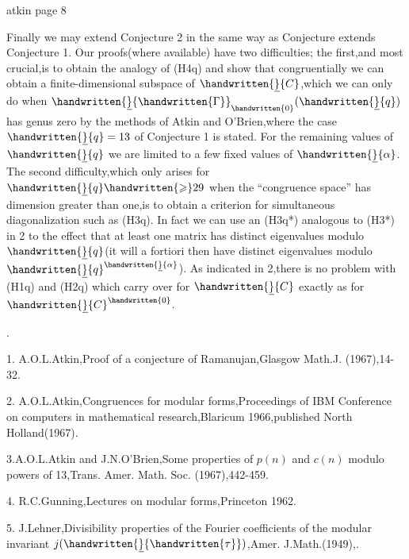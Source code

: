 \begin{flushright}atkin page 8\end{flushright}

Finally we may extend Conjecture 2 in the same way as Conjecture  extends Conjecture 1. Our proofs(where available) have two difficulties; the first,and most crucial,is to obtain the analogy of (H4q) and show that congruentially we can obtain a finite-dimensional subspace of $\handwritten{\underline}{C}$,which we can only do when $\handwritten{\underline}{\handwritten{\Gamma}}_{\handwritten{0}}(\handwritten{\underline}{q})$ has genus zero by the methods of Atkin and O'Brien,where the case $\handwritten{\underline}{q}=13$ of Conjecture 1 is stated. For the remaining values of $\handwritten{\underline}{q}$ we are limited to a few fixed values of $\handwritten{\underline}{\alpha}$. The second difficulty,which only arises for $\handwritten{\underline}{q}\handwritten{\geqslant}29$ when the ``congruence space'' has dimension greater than one,is to obtain a criterion for simultaneous diagonalization such as (H3q). In fact we can use an (H3q*) analogous to (H3*) in \handwritten{\S}2 to the effect that at least one matrix has distinct eigenvalues modulo $\handwritten{\underline}{q}$(it will a fortiori then have distinct eigenvalues modulo $\handwritten{\underline}{q}^{\handwritten{\underline}{\alpha}}$). As indicated in \handwritten{\S}2,there is no problem with (H1q) and (H2q) which carry over for $\handwritten{\underline}{C}$ exactly as for $\handwritten{\underline}{C}^{\handwritten{0}}$.

.

1. A.O.L.Atkin,Proof of a conjecture of Ramanujan,Glasgow Math.J. (1967),14-32.

2. A.O.L.Atkin,Congruences for modular forms,Proceedings of IBM Conference on computers in mathematical research,Blaricum 1966,published North Holland(1967).

3.A.O.L.Atkin and J.N.O'Brien,Some properties of $p(n)$ and $c(n)$ modulo powers of 13,Trans. Amer. Math. Soc. (1967),442-459.

4. R.C.Gunning,Lectures on modular forms,Princeton 1962.

5. J.Lehner,Divisibility properties of the Fourier coefficients of the modular invariant $j(\handwritten{\underline}{\handwritten{\tau}})$,Amer. J.Math.(1949),.\reversemarginpar{}\normalmarginpar

